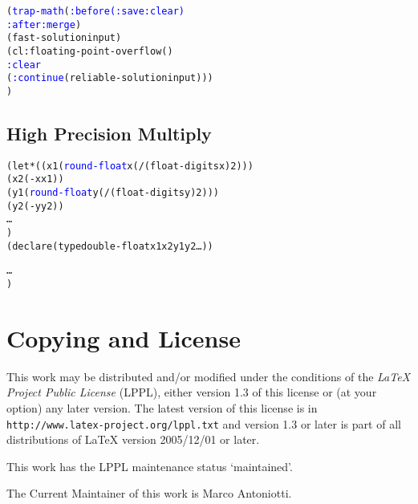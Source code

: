 \documentclass[10pt,fleqn]{article}
\newcommand{\codelia}[1]{\textcolor{blue}{#1}}
\begin{document}
\begin{alltt}
    (\codelia{trap-math} (\codelia{:before (:save :clear)}
                \codelia{:after :merge})
      (fast-solution input)
      (cl:floating-point-overflow ()
         \codelia{:clear}
         (\codelia{:continue} (reliable-solution input)))
      )
\end{alltt}


\subsection{High Precision Multiply}

\begin{alltt}
    (let* ((x1 (\codelia{round-float} x (/ (float-digits x) 2)))
           (x2 (- x x1))
           (y1 (\codelia{round-float} y (/ (float-digits y) 2)))
           (y2 (- y y2))
           \ldots
           )
      (declare (type double-float x1 x2 y1 y2 \ldots))

      \ldots
      )
\end{alltt}

\section{Copying and License}

This work may be distributed and/or modified under the conditions of
the \emph{LaTeX Project Public License} (LPPL), either version 1.3 of
this license or (at your option) any later version. The latest version
of this license is in \texttt{http://www.latex-project.org/lppl.txt}
and version 1.3 or later is part of all distributions of LaTeX version
2005/12/01 or later.

\noindent
This work has the LPPL maintenance status `maintained'.

\noindent
The Current Maintainer of this work is Marco Antoniotti.

\printindex
\end{document}
